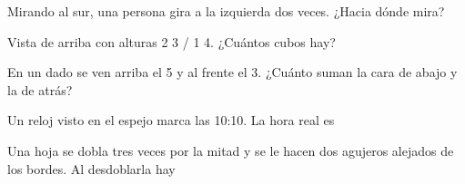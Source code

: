 \bitacora

\evaluacion
\begin{ejercicios}
\item Mirando al sur, una persona gira a la izquierda dos veces. ¿Hacia dónde mira?
\item Vista de arriba con alturas 2 3 / 1 4. ¿Cuántos cubos hay?
\item En un dado se ven arriba el 5 y al frente el 3. ¿Cuánto suman la cara de abajo y la de atrás?
\item Un reloj visto en el espejo marca las 10:10. La hora real es
\item Una hoja se dobla tres veces por la mitad y se le hacen dos agujeros alejados de los bordes. Al desdoblarla hay
\end{ejercicios}
